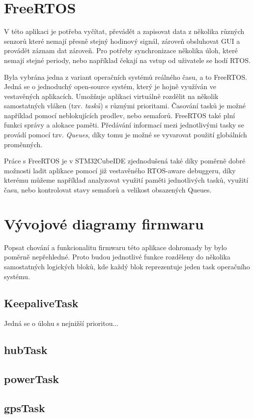 \section{FreeRTOS}
V této aplikaci je potřeba vyčítat, převádět a zapisovat data z několika různých senzorů které nemají přesně stejný hodinový signál, zároveň obsluhovat \ac{GUI} a provádět záznam dat zároveň. Pro potřeby synchronizace několika úloh, které nemají stejné periody, nebo například čekají na vstup od uživatele se hodí \ac{RTOS}.

Byla vybrána jedna z variant operačních systémů reálného času, a to FreeRTOS. Jedná se o jednoduchý open-source systém, který je hojně využíván ve vestavěných aplikacích. Umožňuje aplikaci virtuálně rozdělit na několik samostatných vláken (tzv. \emph{tasků}) s různými prioritami. Časování tasků je možné například pomocí neblokujících prodlev, nebo semaforů. FreeRTOS také plní funkci správy a alokace paměti. Předávání informací mezi jednotlivými tasky se provádí pomocí tzv. \emph{Queues}, díky tomu je možné se vyvarovat použití globálních proměnných. \cite{Zhu2011}

Práce s FreeRTOS je v STM32CubeIDE zjednodušená také díky poměrně dobré možnosti ladit aplikace pomocí již vestavěného RTOS-aware debuggeru, díky kterému můžeme například analyzovat využití paměti jednotlivých tasků, využití času, nebo kontrolovat stavy semaforů a velikost obsazených Queues. 

\section{Vývojové diagramy firmwaru}
Popsat chování a funkcionalitu firmwaru této aplikace dohromady by bylo poměrně nepřehledné. Proto budou jednotlivé funkce rozděleny do několika samostatných logických bloků, kde každý blok reprezentuje jeden task operačního systému.

\subsection{KeepaliveTask}
Jedná se o úlohu s nejnižší prioritou...

\subsection{hubTask}
\subsection{powerTask}
\subsection{gpsTask}
